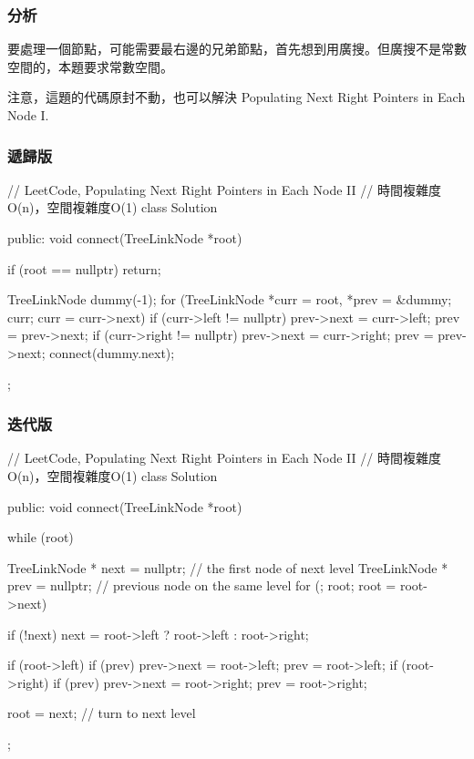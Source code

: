 \subsubsection{分析}
要處理一個節點，可能需要最右邊的兄弟節點，首先想到用廣搜。但廣搜不是常數空間的，本題要求常數空間。

注意，這題的代碼原封不動，也可以解決 Populating Next Right Pointers in Each Node I.


\subsubsection{遞歸版}
\begin{Code}
// LeetCode, Populating Next Right Pointers in Each Node II
// 時間複雜度O(n)，空間複雜度O(1)
class Solution {
public:
    void connect(TreeLinkNode *root) {
        if (root == nullptr) return;

        TreeLinkNode dummy(-1);
        for (TreeLinkNode *curr = root, *prev = &dummy; 
                curr; curr = curr->next) {
            if (curr->left != nullptr){
                prev->next = curr->left;
                prev = prev->next;
            }
            if (curr->right != nullptr){
                prev->next = curr->right;
                prev = prev->next;
            }
        }
        connect(dummy.next);
    }
};
\end{Code}


\subsubsection{迭代版}
\begin{Code}
// LeetCode, Populating Next Right Pointers in Each Node II
// 時間複雜度O(n)，空間複雜度O(1)
class Solution {
public:
    void connect(TreeLinkNode *root) {
        while (root) {
            TreeLinkNode * next = nullptr; // the first node of next level
            TreeLinkNode * prev = nullptr; // previous node on the same level
            for (; root; root = root->next) {
                if (!next) next = root->left ? root->left : root->right;

                if (root->left) {
                    if (prev) prev->next = root->left;
                    prev = root->left;
                }
                if (root->right) {
                    if (prev) prev->next = root->right;
                    prev = root->right;
                }
            }
            root = next; // turn to next level
        }
    }
};
\end{Code}


